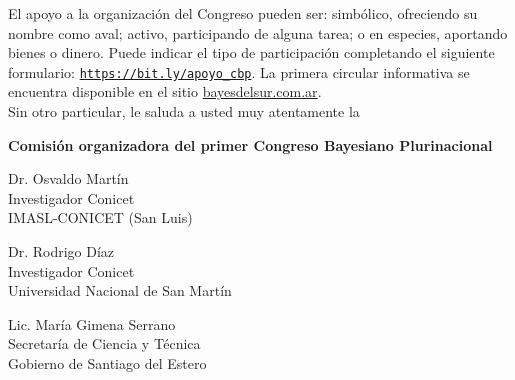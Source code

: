 \documentclass[a4paper,11pt]{article}
\begin{document}
\indent El apoyo a la organización del Congreso pueden ser: simbólico, ofreciendo su nombre como aval; activo, participando de alguna tarea; o en especies, aportando bienes o dinero. Puede indicar el tipo de participación completando el siguiente formulario: \href{https://bit.ly/apoyo_cbp}{\texttt{https://bit.ly/apoyo\_cbp}}. La primera circular informativa se encuentra disponible en el sitio \url{bayesdelsur.com.ar}. \\

\indent Sin otro particular, le saluda a usted muy atentamente la

\textbf{Comisión organizadora del primer Congreso Bayesiano Plurinacional}\\


 \vspace{0.6cm}

 \begin{paracol}{3}

  \scriptsize

\noindent Dr. Osvaldo Martín \\
Investigador Conicet \\
IMASL-CONICET (San Luis)


 \switchcolumn

\noindent Dr. Rodrigo Díaz \\
Investigador Conicet \\
Universidad Nacional de San Martín\\

 \switchcolumn

\noindent Lic. María Gimena Serrano \\
Secretaría de Ciencia y Técnica \\
Gobierno de Santiago del Estero \\

 \end{paracol}

 \vspace{0.6cm}
\end{document}
